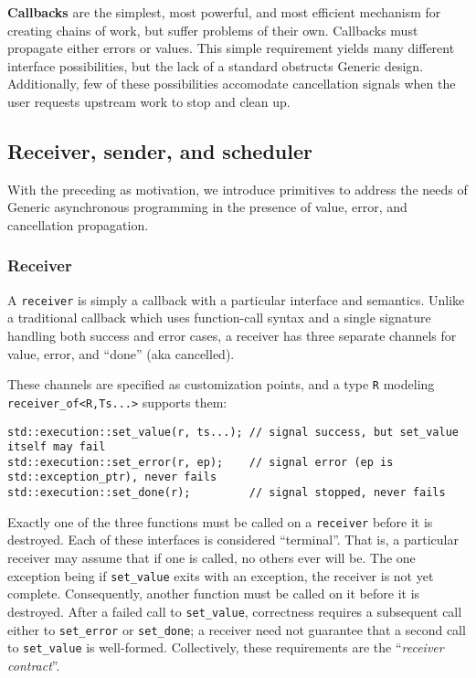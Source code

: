 \documentclass[a4paper,12pt,notitlepage,twoside,openright]{article}
\begin{document}
\textbf{Callbacks} are the simplest, most powerful, and most efficient
mechanism for creating chains of work, but suffer problems of their own.
Callbacks must propagate either errors or values. This simple
requirement yields many different interface possibilities, but the lack
of a standard obstructs Generic design. Additionally, few of these
possibilities accomodate cancellation signals when the user requests
upstream work to stop and clean up.

\hypertarget{receiver-sender-and-scheduler}{%
\subsection{Receiver, sender, and
scheduler}\label{receiver-sender-and-scheduler}}

With the preceding as motivation, we introduce primitives to address the
needs of Generic asynchronous programming in the presence of value,
error, and cancellation propagation.

\hypertarget{receiver}{%
\subsubsection{Receiver}\label{receiver}}

A \texttt{receiver} is simply a callback with a particular
interface and semantics. Unlike a traditional callback which uses
function-call syntax and a single signature handling both success and
error cases, a receiver has three separate channels for value, error,
and ``done'' (aka cancelled).

These channels are specified as customization points, and a type
\texttt{R} modeling
\texttt{receiver_of<R,Ts...>} supports them:

\begin{verbatim}
std::execution::set_value(r, ts...); // signal success, but set_value itself may fail
std::execution::set_error(r, ep);    // signal error (ep is std::exception_ptr), never fails
std::execution::set_done(r);         // signal stopped, never fails
\end{verbatim}

Exactly one of the three functions must be called on a
\texttt{receiver} before it is destroyed. Each of these
interfaces is considered ``terminal''. That is, a particular receiver
may assume that if one is called, no others ever will be. The one
exception being if \texttt{set_value} exits with an
exception, the receiver is not yet complete. Consequently, another
function must be called on it before it is destroyed. After a failed
call to \texttt{set_value}, correctness requires a
subsequent call either to \texttt{set_error} or
\texttt{set_done}; a receiver need not guarantee that a
second call to \texttt{set_value} is well-formed.
Collectively, these requirements are the ``\emph{receiver contract}''.
\end{document}
